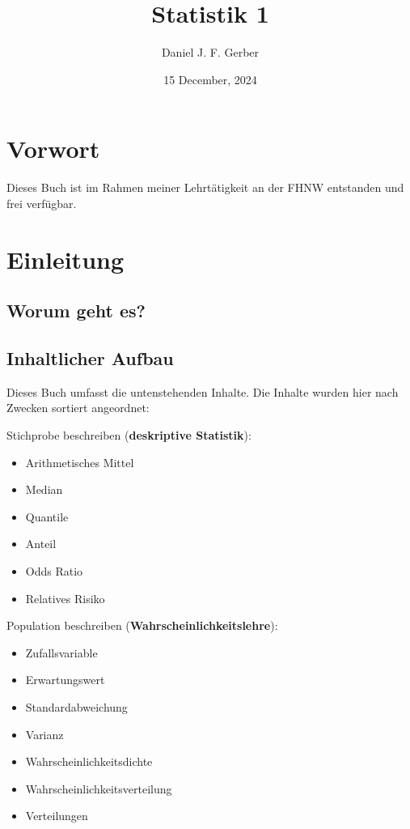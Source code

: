 \documentclass[
]{book}
\title{Statistik 1}
\author{Daniel J. F. Gerber}
\date{15 December, 2024}
\providecommand{\tightlist}{%
  \setlength{\itemsep}{0pt}\setlength{\parskip}{0pt}}
\theoremstyle{definition}
\theoremstyle{definition}
\theoremstyle{definition}
\theoremstyle{definition}
\theoremstyle{remark}
\begin{document}
\maketitle

{
\setcounter{tocdepth}{1}
\tableofcontents
}
\chapter*{Vorwort}\label{vorwort}

Dieses Buch ist im Rahmen meiner Lehrtätigkeit an der FHNW entstanden und frei verfügbar.

\chapter{Einleitung}\label{einleitung}

\section{Worum geht es?}\label{worum-geht-es}

\section{Inhaltlicher Aufbau}\label{inhaltlicher-aufbau}

Dieses Buch umfasst die untenstehenden Inhalte. Die Inhalte wurden hier nach Zwecken sortiert angeordnet:

Stichprobe beschreiben (\textbf{deskriptive Statistik}):

\begin{itemize}
\tightlist
\item
  Arithmetisches Mittel
\item
  Median
\item
  Quantile
\item
  Anteil
\item
  Odds Ratio
\item
  Relatives Risiko
\end{itemize}

Population beschreiben (\textbf{Wahrscheinlichkeitslehre}):

\begin{itemize}
\tightlist
\item
  Zufallsvariable
\item
  Erwartungswert
\item
  Standardabweichung
\item
  Varianz
\item
  Wahrscheinlichkeitsdichte
\item
  Wahrscheinlichkeitsverteilung
\item
  Verteilungen
\end{itemize}
\end{document}
